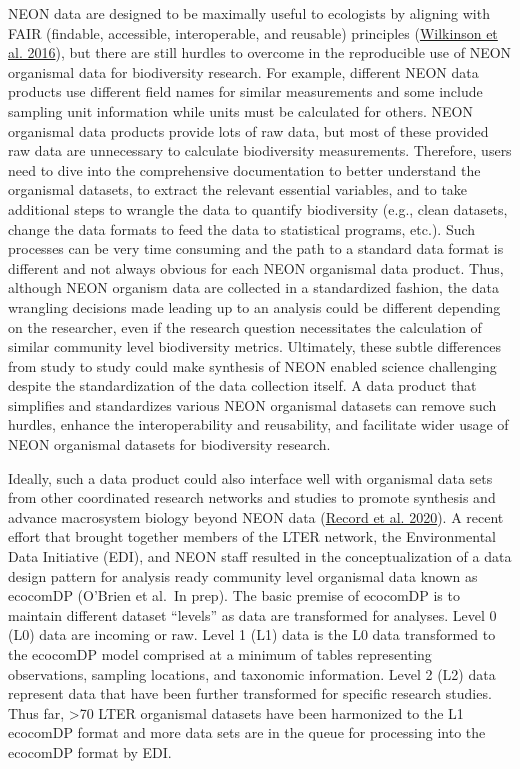 \documentclass[
  12pt,
]{article}
\begin{document}
NEON data are designed to be maximally useful to ecologists by aligning with FAIR (findable, accessible, interoperable, and reusable) principles (\protect\hyperlink{ref-wilkinson2016fair}{Wilkinson et al. 2016}), but there are still hurdles to overcome in the reproducible use of NEON organismal data for biodiversity research. For example, different NEON data products use different field names for similar measurements and some include sampling unit information while units must be calculated for others. NEON organismal data products provide lots of raw data, but most of these provided raw data are unnecessary to calculate biodiversity measurements. Therefore, users need to dive into the comprehensive documentation to better understand the organismal datasets, to extract the relevant essential variables, and to take additional steps to wrangle the data to quantify biodiversity (e.g., clean datasets, change the data formats to feed the data to statistical programs, etc.). Such processes can be very time consuming and the path to a standard data format is different and not always obvious for each NEON organismal data product. Thus, although NEON organism data are collected in a standardized fashion, the data wrangling decisions made leading up to an analysis could be different depending on the researcher, even if the research question necessitates the calculation of similar community level biodiversity metrics. Ultimately, these subtle differences from study to study could make synthesis of NEON enabled science challenging despite the standardization of the data collection itself. A data product that simplifies and standardizes various NEON organismal datasets can remove such hurdles, enhance the interoperability and reusability, and facilitate wider usage of NEON organismal datasets for biodiversity research.

Ideally, such a data product could also interface well with organismal data sets from other coordinated research networks and studies to promote synthesis and advance macrosystem biology beyond NEON data (\protect\hyperlink{ref-record2020novel}{Record et al. 2020}). A recent effort that brought together members of the LTER network, the Environmental Data Initiative (EDI), and NEON staff resulted in the conceptualization of a data design pattern for analysis ready community level organismal data known as ecocomDP (O'Brien et al.~In prep). The basic premise of ecocomDP is to maintain different dataset ``levels'' as data are transformed for analyses. Level 0 (L0) data are incoming or raw. Level 1 (L1) data is the L0 data transformed to the ecocomDP model comprised at a minimum of tables representing observations, sampling locations, and taxonomic information. Level 2 (L2) data represent data that have been further transformed for specific research studies. Thus far, \textgreater70 LTER organismal datasets have been harmonized to the L1 ecocomDP format and more data sets are in the queue for processing into the ecocomDP format by EDI.
\end{document}
